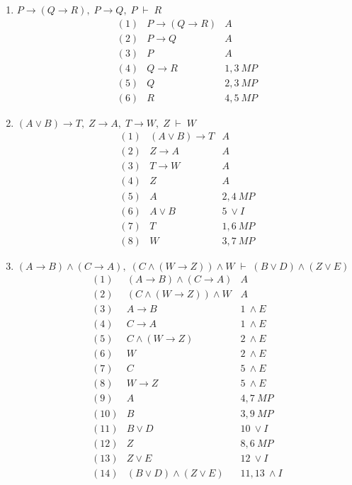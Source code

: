 \documentclass[12pt,fleqn]{article}
\begin{document}
\begin{enumerate}
\item $P\to(Q\to R),\; P\to Q,\; P \;\vdash\; R$
\[
\begin{array}{rll}
(1) & P\to(Q\to R) & A \\
(2) & P\to Q       & A \\
(3) & P            & A \\
(4) & Q\to R       & 1,3\ MP \\
(5) & Q            & 2,3\ MP \\
(6) & R            & 4,5\ MP
\end{array}
\]

\item $(A\vee B)\to T,\; Z\to A,\; T\to W,\; Z \;\vdash\; W$
\[
\begin{array}{rll}
(1) & (A\vee B)\to T & A \\
(2) & Z\to A         & A \\
(3) & T\to W         & A \\
(4) & Z              & A \\
(5) & A              & 2,4\ MP \\
(6) & A\vee B         & 5\ \vee I \\
(7) & T              & 1,6\ MP \\
(8) & W              & 3,7\ MP
\end{array}
\]

\item $(A\to B)\wedge(C\to A),\; (C\wedge(W\to Z))\wedge W \;\vdash\; (B\vee D)\wedge(Z\vee E)$
\[
\begin{array}{rll}
(1)  & (A\to B)\wedge(C\to A)            & A \\
(2)  & (C\wedge(W\to Z))\wedge W          & A \\
(3)  & A\to B                             & 1\ \wedge E \\
(4)  & C\to A                             & 1\ \wedge E \\
(5)  & C\wedge(W\to Z)                    & 2\ \wedge E \\
(6)  & W                                  & 2\ \wedge E \\
(7)  & C                                  & 5\ \wedge E \\
(8)  & W\to Z                             & 5\ \wedge E \\
(9)  & A                                  & 4,7\ MP \\
(10) & B                                  & 3,9\ MP \\
(11) & B\vee D                            & 10\ \vee I \\
(12) & Z                                  & 8,6\ MP \\
(13) & Z\vee E                            & 12\ \vee I \\
(14) & (B\vee D)\wedge(Z\vee E)           & 11,13\ \wedge I
\end{array}
\]


\end{enumerate}
\end{document}
